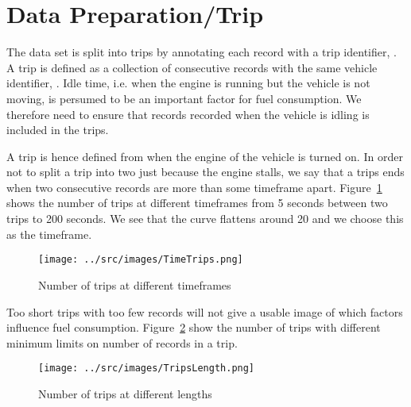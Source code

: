 \section{Data Preparation/Trip}

The data set is split into trips by annotating each record with a trip identifier, \tid.
A trip is defined as a collection of consecutive records with the same vehicle identifier, \vid.
Idle time, i.e. when the engine is running but the vehicle is not moving, is persumed to be an important factor for fuel consumption. 
We therefore need to ensure that records recorded when the vehicle is idling is included in the trips. 

A trip is hence defined from when the engine of the vehicle is turned on.
In order not to split a trip into two just because the engine stalls, we say that a trips ends when two consecutive records are more than some timeframe apart.
Figure~\ref{fig:TimeTrips} shows the number of trips at different timeframes from 5 seconds between two trips to 200 seconds.
We see that the curve flattens around 20 and we choose this as the timeframe. 
\begin{figure}[htb]
\centering
\texttt{[image: ../src/images/TimeTrips.png]}
\caption{Number of trips at different timeframes}
\label{fig:TimeTrips}
\end{figure}

Too short trips with too few records will not give a usable image of which factors influence fuel consumption.
Figure~\ref{fig:LengthTrips} show the number of trips with different minimum limits on number of records in a trip.
\begin{figure}[htb]
\centering
\texttt{[image: ../src/images/TripsLength.png]}
\caption{Number of trips at different lengths}
\label{fig:LengthTrips}
\end{figure}